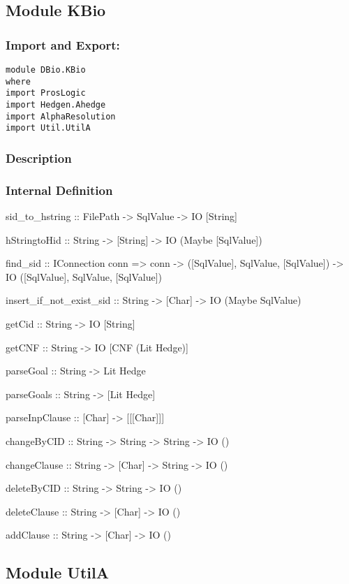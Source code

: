 \documentclass[../gr-final.tex]{subfiles}
\begin{document}
\subsection{Module KBio}
\subsubsection{Import and Export:}
\begin{lstlisting}
module DBio.KBio 
where
import ProsLogic
import Hedgen.Ahedge
import AlphaResolution
import Util.UtilA
\end{lstlisting}
\subsubsection{Description}

\subsubsection{Internal Definition}
sid\_to\_hstring :: FilePath -> SqlValue -> IO [String]

hStringtoHid :: String -> [String] -> IO (Maybe [SqlValue])

find\_sid :: IConnection conn => conn -> ([SqlValue], SqlValue,
[SqlValue]) -> IO ([SqlValue], SqlValue, [SqlValue])

insert\_if\_not\_exist\_sid :: String -> [Char] -> IO (Maybe
SqlValue)

getCid :: String -> IO [String]

getCNF :: String -> IO [CNF (Lit Hedge)]

parseGoal :: String -> Lit Hedge

parseGoals :: String -> [Lit Hedge]

parseInpClause :: [Char] -> [[[Char]]]

changeByCID :: String -> String -> String -> IO ()

changeClause :: String -> [Char] -> String -> IO ()

deleteByCID :: String -> String -> IO ()

deleteClause :: String -> [Char] -> IO ()

addClause :: String -> [Char] -> IO ()

\subsection{Module UtilA}
\end{document}
